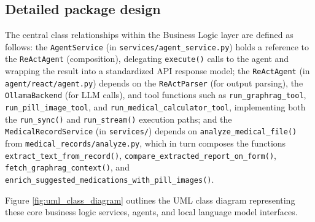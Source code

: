 \documentclass[../main.tex]{subfiles}
\begin{document}
\subsection{Detailed package design}
\label{subsection:4.1.3}

The central class relationships within the Business Logic layer are defined as follows: the \texttt{AgentService} (in \nolinkurl{services/agent_service.py}) holds a reference to the \texttt{ReActAgent} (composition), delegating \texttt{execute()} calls to the agent and wrapping the result into a standardized API response model; the \texttt{ReActAgent} (in \nolinkurl{agent/react/agent.py}) depends on the \texttt{ReActParser} (for output parsing), the \texttt{OllamaBackend} (for LLM calls), and tool functions such as \nolinkurl{run_graphrag_tool}, \nolinkurl{run_pill_image_tool}, and \nolinkurl{run_medical_calculator_tool}, implementing both the \texttt{run\_sync()} and \texttt{run\_stream()} execution paths; and the \texttt{MedicalRecordService} (in \texttt{services/}) depends on \nolinkurl{analyze_medical_file()} from \nolinkurl{medical_records/analyze.py}, which in turn composes the functions \nolinkurl{extract_text_from_record()}, \nolinkurl{compare_extracted_report_on_form()}, \nolinkurl{fetch_graphrag_context()}, and \nolinkurl{enrich_suggested_medications_with_pill_images()}.

Figure \ref{fig:uml_class_diagram} outlines the UML class diagram representing these core business logic services, agents, and local language model interfaces.
\end{document}
